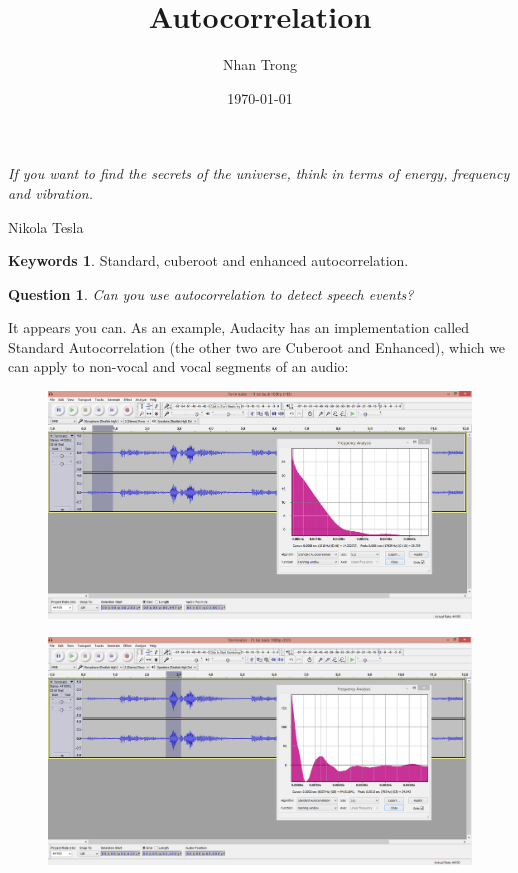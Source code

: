 \documentclass[12pt]{article}
\title{Autocorrelation}
\author{Nhan Trong}
\date{\today}                                           %
\theoremstyle{plain}
\newtheorem{question}[theorem]{Question}
\theoremstyle{definition}
\newtheorem*{keywords}{Keywords}
\theoremstyle{remark}
\begin{document}
\maketitle

\epigraph{\textit{If you want to find the secrets of the universe, think in terms of energy, frequency and vibration.}}{Nikola Tesla}

\begin{keywords}
Standard, cuberoot and enhanced autocorrelation.
\end{keywords}

\begin{question}
Can you use autocorrelation to detect speech events?
\end{question}

It appears you can. As an example, Audacity has an implementation called Standard Autocorrelation (the other two are Cuberoot and Enhanced), which we can apply to non-vocal and vocal segments of an audio:

\begin{figure}[H]
\centering
\includegraphics[width=1.0\textwidth]{autocorrelation1}
\end{figure}

\begin{figure}[H]
\centering
\includegraphics[width=1.0\textwidth]{autocorrelation2}
\end{figure}
\end{document}
